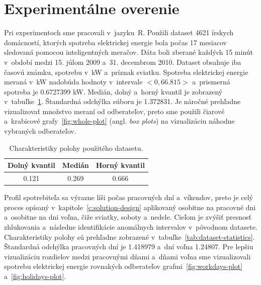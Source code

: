 \documentclass[a4paper,twoside,slovak,12pt,appendix]{article}
\begin{document}
\newpage\null\thispagestyle{empty}\newpage


\newpage
\section{Experimentálne overenie}
\label{c:experimental-verification}
Pri experimentoch sme pracovali v~jazyku~R. Použili dataset 4621 írskych
domácností, ktorých spotreba elektrickej energie bola počas 17 mesiacov
sledovaná pomocou inteligentných meračov. Dáta boli zberané každých 15 minút
v~období medzi 15. júlom 2009 a~31. decembrom 2010. Dataset obsahuje iba časovú
známku, spotrebu v~kW a~príznak sviatku. Spotreba elektrickej energie meraná
v~kW nadobúda hodnoty v~intervale $<0, 66.815>$ a~priemerná spotreba je
0.6727399 kW. Medián, dolný a~horný kvantil je zobrazený
v~tabuľke~\ref{tab:quantile}. Štandardná odchýlka súboru je 1.372831. Je náročné
prehľadne vizualizovať množstvo meraní od odberateľov, preto sme použili čiarové
a~krabicové grafy~\ref{fig:whole-plot} (angl. \textit{box plots}) na
vizualizáciu náhodne vybraných odberateľov.

\begin{table}[htbp]
  \centering
  \caption{Charakteristiky polohy použitého datasetu.}
  \label{tab:quantile}
  \begin{tabular}{|c|c|c|}
    \hline
    \textbf{Dolný kvantil}  &   \textbf{Medián}		&		\textbf{Horný kvantil} \\ \hline
    0.121								    &   0.269							&		0.666					         \\ \hline
  \end{tabular}
\end{table}

\noindent
Profil spotrebiteľa sa výrazne líši počas pracovných dní a~víkendov, preto je
celý proces opísaný v~kapitole~\ref{c:solution-design} aplikovaný osobitne na
pracovné dni a~osobitne na dni voľna, čiže sviatky, soboty a~nedele. Cieľom je
zvýšiť presnosť zhlukovania a~následne identifikácie anomálnych intervalov
v~pôvodnom datasete. Charakteristiky polohy sú prehľadne zobrazené
v~tabuľke~\ref{tab:dataset-statistics}. Štandardná odchýlka pracovných dní je
1.418979 a~dní voľna 1.24807. Pre lepšiu vizualizáciu rozdielov medzi pracovnými
dňami a~dňami voľna sme vizualizovali spotrebu elektrickej energie rovnakých
odberateľov grafmi~\ref{fig:workdays-plot} a~\ref{fig:holidays-plot}.
\end{document}

